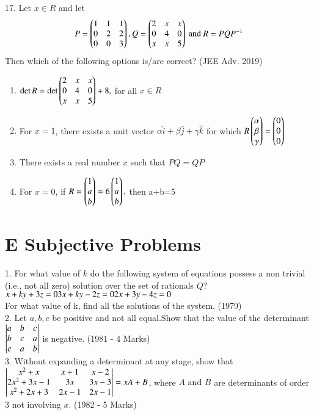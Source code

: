 \documentclass[journal,12pt,twocolumn]{IEEEtran}
\theoremstyle{remark}
\begin{document}
17. Let $x\in R$ and let
$$P = \begin{pmatrix}1&1&1\\0&2&2\\0&0&3\end{pmatrix},Q = \begin{pmatrix}2&x&x\\0&4&0\\x&x&5\end{pmatrix} \text{ and }R=PQP^{-1}$$
Then which of the following options is/are correct? \hfill (JEE Adv. 2019)


\begin{enumerate}
\item $\det R = \det\begin{pmatrix}2&x&x\\0&4&0\\x&x&5\end{pmatrix}+8,$ for all $x\in R$
\item For $x=1$, there exists a unit vector $\alpha\hat{i}+\beta\hat{j}+\gamma\hat{k}$ for which $R\begin{pmatrix}\alpha\\\beta\\\gamma\end{pmatrix}=\begin{pmatrix}0\\0\\0\end{pmatrix}$
		\item There exists a real number $x$ such that $PQ = QP$
		\item For $x=0$, if $R=\begin{pmatrix}1\\a\\b\end{pmatrix}=6\begin{pmatrix}1\\a\\b\end{pmatrix},$ then a+b=5\\[2pt]
\end{enumerate}

\section{E Subjective Problems}

1. For what value of $k$ do the following system of equations possess a non trivial (i.e., not all zero) solution over the set of rationals $Q$?\\
$x+ky+3z=0\\3x+ky-2z=0\\2x+3y-4z=0$\\ For what value of k, find all the solutions of the system. \hfill (1979)\\[2pt]

2. Let $a,b,c$ be positive and not all equal.Show that the value of the determinant $\begin{vmatrix}a&b&c\\b&c&a\\c&a&b\end{vmatrix}$ is negative. \hfill (1981 - 4 Marks)\\[2pt]

3. Without expanding a determinant at any stage, show that $\begin{vmatrix}x^2+x&x+1&x-2\\2x^2+3x-1&3x&3x-3\\x^2+2x+3&2x-1&2x-1\end{vmatrix}=xA+B$, where $A\text{ and }B$ are determinants of order 3 not involving $x$. \hfill (1982 - 5 Marks)\\[2pt]
\end{document}
